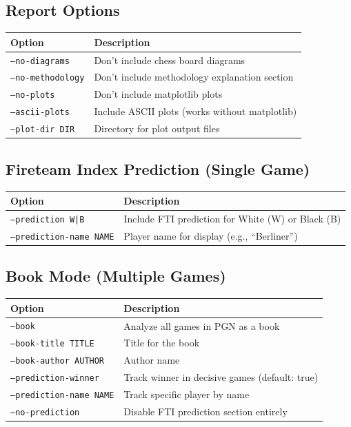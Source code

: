 \documentclass[12pt]{book}
\begin{document}
\subsection{Report Options}

\begin{center}
\begin{tabular}{ll}
\toprule
\textbf{Option} & \textbf{Description} \\
\midrule
\texttt{--no-diagrams} & Don't include chess board diagrams \\
\texttt{--no-methodology} & Don't include methodology explanation section \\
\texttt{--no-plots} & Don't include matplotlib plots \\
\texttt{--ascii-plots} & Include ASCII plots (works without matplotlib) \\
\texttt{--plot-dir DIR} & Directory for plot output files \\
\bottomrule
\end{tabular}
\end{center}

\subsection{Fireteam Index Prediction (Single Game)}

\begin{center}
\begin{tabular}{ll}
\toprule
\textbf{Option} & \textbf{Description} \\
\midrule
\texttt{--prediction W|B} & Include FTI prediction for White (W) or Black (B) \\
\texttt{--prediction-name NAME} & Player name for display (e.g., ``Berliner'') \\
\bottomrule
\end{tabular}
\end{center}

\subsection{Book Mode (Multiple Games)}

\begin{center}
\begin{tabular}{ll}
\toprule
\textbf{Option} & \textbf{Description} \\
\midrule
\texttt{--book} & Analyze all games in PGN as a book \\
\texttt{--book-title TITLE} & Title for the book \\
\texttt{--book-author AUTHOR} & Author name \\
\texttt{--prediction-winner} & Track winner in decisive games (default: true) \\
\texttt{--prediction-name NAME} & Track specific player by name \\
\texttt{--no-prediction} & Disable FTI prediction section entirely \\
\bottomrule
\end{tabular}
\end{center}
\end{document}
